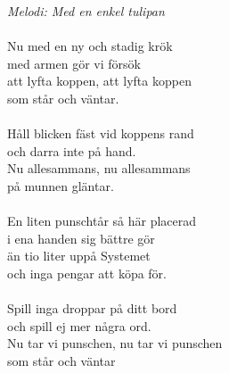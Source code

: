 {\footnotesize\textit{Melodi: Med en enkel tulipan}}\\
\\
Nu med en ny och stadig krök\\
med armen gör vi försök\\
att lyfta koppen, att lyfta koppen\\
som står och väntar.\\
\\
Håll blicken fäst vid koppens rand \\
och darra inte på hand.\\
Nu allesammans, nu allesammans\\
på munnen gläntar.\\
\\
En liten punschtår så här placerad\\
i ena handen sig bättre gör\\
än tio liter uppå Systemet\\
och inga pengar att köpa för.\\
\\
Spill inga droppar på ditt bord\\
och spill ej mer några ord.\\
Nu tar vi punschen, nu tar vi punschen\\
som står och väntar
